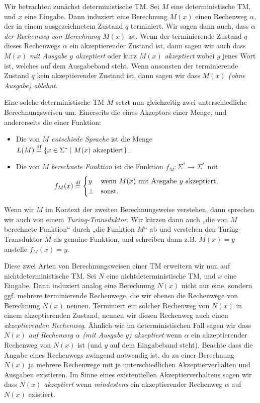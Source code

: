 Wir betrachten zunächst deterministische TM.
Sei $M$ eine deterministische TM, und $x$ eine Eingabe. Dann induziert eine Berechnung $M(x)$ einen Rechenweg $\alpha$, der in einem ausgezeichnetem Zustand $q$ terminiert. 
Wir sagen dann auch, dass \emph{$\alpha$ der Rechenweg von Berechnung $M(x)$} ist.
Wenn der terminierende Zustand $q$ dieses Rechenwegs $\alpha$ ein akzeptierender Zustand ist,
dann sagen wir auch dass \emph{$M(x)$ mit Ausgabe $y$ akzeptiert} oder kurz \emph{$M(x)$ akzeptiert} wobei $y$ jenes Wort ist, welches auf dem Ausgabeband steht.
Wenn ansonsten der terminierende Zustand $q$ kein akzeptierender Zustand ist, dann sagen wir dass \emph{$M(x)$ (ohne Ausgabe) ablehnt}.

Eine solche deterministische TM $M$ setzt nun gleichzeitig zwei unterschiedliche Berechnungsweisen um. Einerseits die eines Akzeptors einer Menge, und andererseits die einer Funktion:
\begin{itemize}
    \item Die von $M$ \emph{entschiede  Sprache} ist die Menge $L(M)\stackrel{\text{df}}{=}\{ x\in\Sigma^* \mid M(x) \text{ akzeptiert} \}$.
    \item Die von $M$ \emph{berechnete Funktion} ist die Funktion $f_M\colon\Sigma^*\to\Sigma^*$ mit
        \[ f_M(x) \stackrel{\text{df}}{=} \begin{cases} y & \text{wenn $M(x)$ mit Ausgabe $y$ akzeptiert,} \\ \bot & \text{sonst.} \end{cases} \] 
\end{itemize}
Wenn wir $M$ im Kontext der zweiten Berechnungsweise verstehen, dann sprechen wir auch von einem \emph{Turing-Transduktor}. 
Wir kürzen dann auch „die von $M$ berechnete Funktion“ durch „die Funktion $M$“ ab und verstehen den Turing-Transduktor $M$ als genuine Funktion, und schreiben dann z.B. $M(x)=y$ anstelle $f_M(x)=y$.

Diese zwei Arten von Berechnungsweisen einer TM erweitern wir nun auf nichtdeterministische TM. 
Sei  $N$ eine nichtdeterministische TM, und $x$ eine Eingabe. Dann induziert analog eine Berechnung $N(x)$ nicht nur eine, sondern ggf. mehrere terminierende Rechenwege, die wir ebenso die Rechenwege von Berechnung $N(x)$ nennen. Terminiert ein solcher Rechenweg von $N(x)$ in einem akzeptierenden Zustand, nennen wir diesen Rechenweg auch einen \emph{akzeptierenden Rechenweg}.
Ähnlich wie im deterministischen Fall sagen wir dass \emph{$N(x)$ auf Rechenweg $\alpha$ (mit Ausgabe $y$) akzeptiert}  wenn $\alpha$ ein akzeptierender Rechenweg von $N(x)$ ist (und $y$ auf dem Eingabeband steht).
Beachte dass die Angabe eines Rechenwegs zwingend notwendig ist, da zu einer Berechnung $N(x)$ ja mehrere Rechenwege mit je unterschiedlichen Akzeptierverhalten und Ausgaben existieren.
Im Sinne eines existentiellen Akzeptierverhaltens sagen wir dass \emph{$N(x)$ akzeptiert} wenn \emph{mindestens} ein akzeptierender Rechenweg $\alpha$ auf $N(x)$ existiert.


